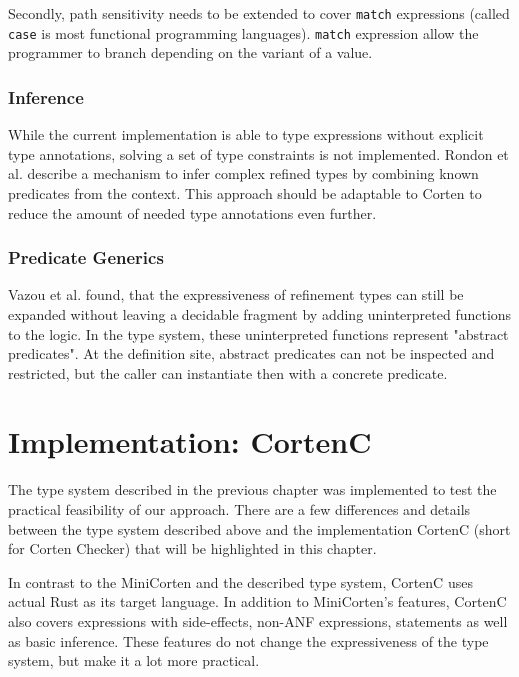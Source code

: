 \documentclass{book}
\newcommand{\code}[1]{\texttt{#1}}
\theoremstyle{definition}
\begin{document}
Secondly, path sensitivity needs to be extended to cover \code{match} expressions (called \code{case} is most functional programming languages). \code{match} expression allow the programmer to branch depending on the variant of a value.

\subsection{Inference}

While the current implementation is able to type expressions without explicit type annotations, solving a set of type constraints is not implemented. 
Rondon et al. \cite{rondon_liquid_2008} describe a mechanism to infer complex refined types by combining known predicates from the context. This approach should be adaptable to Corten to reduce the amount of needed type annotations even further.


\subsection{Predicate Generics}

Vazou et al. \cite{vazou_abstract_2013} found, that the expressiveness of refinement types can still be expanded without leaving a decidable fragment by adding uninterpreted functions to the logic. In the type system, these uninterpreted functions represent "abstract predicates". At the definition site, abstract predicates can not be inspected and restricted, but the caller can instantiate then with a concrete predicate.



\chapter{Implementation: CortenC}

The type system described in the previous chapter was implemented to test the practical feasibility of our approach.
There are a few differences and details between the type system described above and the implementation CortenC (short for Corten Checker) that will be highlighted in this chapter.

In contrast to the MiniCorten and the described type system, CortenC uses actual Rust as its target language. In addition to MiniCorten's features, CortenC also covers expressions with side-effects, non-ANF expressions, statements as well as basic inference.
These features do not change the expressiveness of the type system, but make it a lot more practical.
\end{document}
